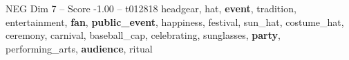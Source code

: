\begin{textsample}{NEG Dim 7 – Score -1.00 – t012818}  \label{ex:f7_neg_026}
headgear, hat, \textbf{event}, tradition, entertainment, \textbf{fan}, \textbf{public\_event}, happiness, festival, sun\_hat, costume\_hat, ceremony, carnival, baseball\_cap, celebrating, sunglasses, \textbf{party}, performing\_arts, \textbf{audience}, ritual

\end{textsample}
